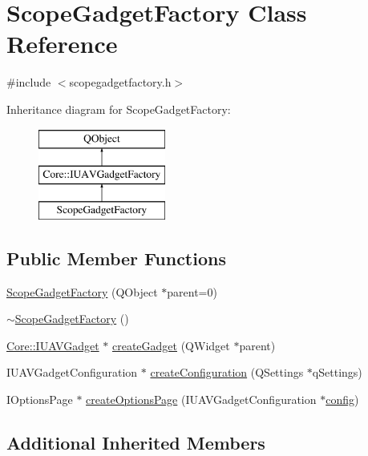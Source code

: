 \hypertarget{class_scope_gadget_factory}{\section{Scope\-Gadget\-Factory Class Reference}
\label{class_scope_gadget_factory}
}


{\ttfamily \#include $<$scopegadgetfactory.\-h$>$}

Inheritance diagram for Scope\-Gadget\-Factory\-:\begin{figure}[H]
\begin{center}
\leavevmode
\includegraphics[height=3.000000cm]{class_scope_gadget_factory}
\end{center}
\end{figure}
\subsection*{Public Member Functions}
\begin{DoxyCompactItemize}
\item 
\hyperlink{group___scope_plugin_gace4d87876bb88a527c473e6f363a4a60}{Scope\-Gadget\-Factory} (Q\-Object $\ast$parent=0)
\item 
\hyperlink{group___scope_plugin_gae7d925002f23646412ea50bf0a6c1658}{$\sim$\-Scope\-Gadget\-Factory} ()
\item 
\hyperlink{class_core_1_1_i_u_a_v_gadget}{Core\-::\-I\-U\-A\-V\-Gadget} $\ast$ \hyperlink{group___scope_plugin_ga38da87ae88b0f1bd3ae63e997528ed56}{create\-Gadget} (Q\-Widget $\ast$parent)
\item 
I\-U\-A\-V\-Gadget\-Configuration $\ast$ \hyperlink{group___scope_plugin_gacbb08116cc0c7390601e30b6cfde0cba}{create\-Configuration} (Q\-Settings $\ast$q\-Settings)
\item 
I\-Options\-Page $\ast$ \hyperlink{group___scope_plugin_ga121b0d9857a168a0ad41f980d5c34b63}{create\-Options\-Page} (I\-U\-A\-V\-Gadget\-Configuration $\ast$\hyperlink{deflate_8c_a4473b5227787415097004fd39f55185e}{config})
\end{DoxyCompactItemize}
\subsection*{Additional Inherited Members}


